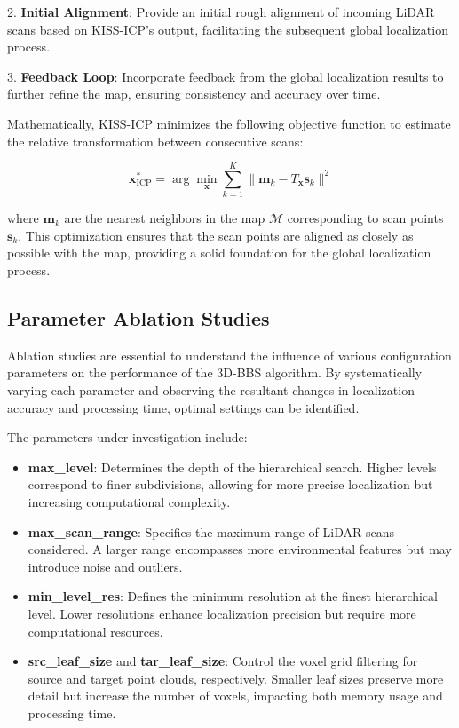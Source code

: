 2. \textbf{Initial Alignment}: Provide an initial rough alignment of incoming LiDAR scans based on KISS-ICP's output, facilitating the subsequent global localization process.

3. \textbf{Feedback Loop}: Incorporate feedback from the global localization results to further refine the map, ensuring consistency and accuracy over time.

Mathematically, KISS-ICP minimizes the following objective function to estimate the relative transformation between consecutive scans:

$$\mathbf{x}_{\text{ICP}}^* = \arg\min_{\mathbf{x}} \sum_{k=1}^{K} \|\mathbf{m}_k - T_{\mathbf{x}}\mathbf{s}_k\|^2$$

where $\mathbf{m}_k$ are the nearest neighbors in the map $\mathcal{M}$ corresponding to scan points $\mathbf{s}_k$. This optimization ensures that the scan points are aligned as closely as possible with the map, providing a solid foundation for the global localization process.

\subsection{Parameter Ablation Studies}
Ablation studies are essential to understand the influence of various configuration parameters on the performance of the 3D-BBS algorithm. By systematically varying each parameter and observing the resultant changes in localization accuracy and processing time, optimal settings can be identified.

The parameters under investigation include:

\begin{itemize}
    \item \textbf{max\_level}: Determines the depth of the hierarchical search. Higher levels correspond to finer subdivisions, allowing for more precise localization but increasing computational complexity.
    \item \textbf{max\_scan\_range}: Specifies the maximum range of LiDAR scans considered. A larger range encompasses more environmental features but may introduce noise and outliers.
    \item \textbf{min\_level\_res}: Defines the minimum resolution at the finest hierarchical level. Lower resolutions enhance localization precision but require more computational resources.
    \item \textbf{src\_leaf\_size} and \textbf{tar\_leaf\_size}: Control the voxel grid filtering for source and target point clouds, respectively. Smaller leaf sizes preserve more detail but increase the number of voxels, impacting both memory usage and processing time.
\end{itemize}

